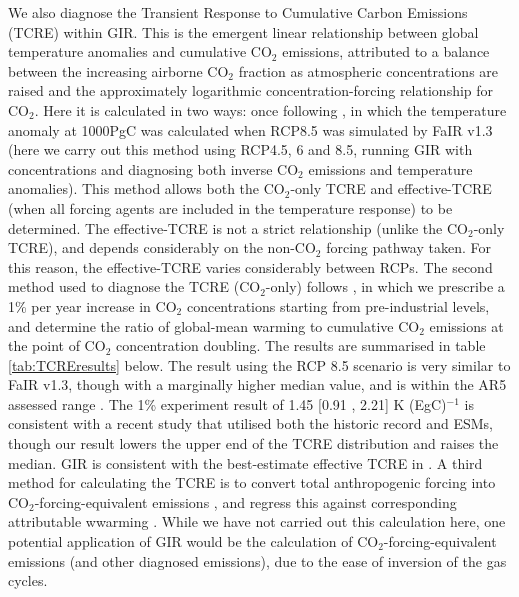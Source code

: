 \documentclass[gmd, manuscript]{copernicus}
\begin{document}
We also diagnose the Transient Response to Cumulative Carbon Emissions (TCRE) within GIR. This is the emergent linear relationship between global temperature anomalies and cumulative CO$_2$ emissions, attributed to a balance between the increasing airborne CO$_2$ fraction as atmospheric concentrations are raised and the approximately logarithmic concentration-forcing relationship for CO$_2$. Here it is calculated in two ways: once following \citeauthor{Smith2017}, in which the temperature anomaly at 1000PgC was calculated when RCP8.5 was simulated by FaIR v1.3 (here we carry out this method using RCP4.5, 6 and 8.5, running GIR with concentrations and diagnosing both inverse CO$_2$ emissions and temperature anomalies). This method allows both the CO$_2$-only TCRE and effective-TCRE (when all forcing agents are included in the temperature response) to be determined. The effective-TCRE is not a strict relationship (unlike the CO$_2$-only TCRE), and depends considerably on the non-CO$_2$ forcing pathway taken. For this reason, the effective-TCRE varies considerably between RCPs. The second method used to diagnose the TCRE (CO$_2$-only) follows \cite{Gillett2013}, in which we prescribe a 1\% per year increase in CO$_2$ concentrations starting from pre-industrial levels, and determine the ratio of global-mean warming to cumulative CO$_2$ emissions at the point of CO$_2$ concentration doubling. The results are summarised in table \ref{tab:TCREresults} below. The result using the RCP 8.5 scenario is very similar to FaIR v1.3, though with a marginally higher median value, and is within the AR5 assessed range \citep{Collins2013}. The 1\% experiment result of 1.45 [0.91 , 2.21] K (EgC)$^{-1}$ is consistent with a recent study \citep{Millar20160449} that utilised both the historic record and ESMs, though our result lowers the upper end of the TCRE distribution and raises the median. GIR is consistent with the best-estimate effective TCRE in \citeauthor{Millar20160449}. A third method for calculating the TCRE is to convert total anthropogenic forcing into CO$_2$-forcing-equivalent emissions \citep{Jenkins2018}, and regress this against corresponding attributable wwarming \citep{Haustein2017}. While we have not carried out this calculation here, one potential application of GIR would be the calculation of CO$_2$-forcing-equivalent emissions (and other diagnosed emissions), due to the ease of inversion of the gas cycles.
\end{document}
